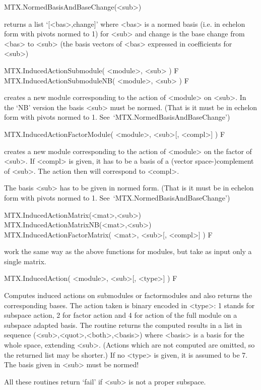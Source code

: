 
\>MTX.NormedBasisAndBaseChange(<sub>)

returns a list `[<bas>,change]' where <bas> is a normed basis (i.e. in
echelon form with pivots normed to 1) for <sub> and change is the base change
from <bas> to <sub> (the basis vectors of <bas> expressed in coefficients for
<sub>)


\>MTX.InducedActionSubmodule( <module>, <sub> ) F
\>MTX.InducedActionSubmoduleNB( <module>, <sub> ) F

creates a new module corresponding to the action of <module> on <sub>. In
the `NB' version the basis <sub> must be normed. (That is it must be in
echelon form with pivots normed to 1. See~`MTX.NormedBasisAndBaseChange')

\>MTX.InducedActionFactorModule( <module>, <sub>[, <compl>] ) F

creates a new module corresponding to the action of <module> on the
factor of <sub>. If <compl> is given, it has to be a basis of a
(vector space-)complement of <sub>. The action then will correspond to
<compl>.

The basis <sub> has to be given in normed form. (That is it must be in
echelon form with pivots normed to 1. See~`MTX.NormedBasisAndBaseChange')

\>MTX.InducedActionMatrix(<mat>,<sub>)
\>MTX.InducedActionMatrixNB(<mat>,<sub>)
\>MTX.InducedActionFactorMatrix( <mat>, <sub>[, <compl>] ) F

work the same way as the above functions for modules, but take as input only
a single matrix.

\>MTX.InducedAction( <module>, <sub>[, <type>] ) F

Computes induced actions on submodules or factormodules and also returns the
corresponding bases. The action taken is binary encoded in <type>:
1 stands for subspace action, 2 for
factor action and 4 for action of the full module
on a subspace adapted basis.
The routine returns the computed results in a list in sequence
(<sub>,<quot>,<both>,<basis>) where <basis> is a basis for the whole space,
extending <sub>. (Actions which are not computed are omitted, so the
returned list may be shorter.)
If no <type> is given, it is assumed to be 7.
The basis given in <sub> must be normed!

All these routines return `fail' if <sub> is not a proper subspace.


